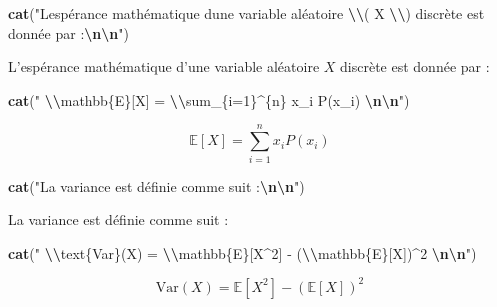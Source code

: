\documentclass[
]{article}
\newenvironment{Shaded}{\begin{snugshade}}{\end{snugshade}}
\newcommand{\FunctionTok}[1]{\textcolor[rgb]{0.13,0.29,0.53}{\textbf{#1}}}
\newcommand{\NormalTok}[1]{#1}
\newcommand{\SpecialCharTok}[1]{\textcolor[rgb]{0.81,0.36,0.00}{\textbf{#1}}}
\newcommand{\StringTok}[1]{\textcolor[rgb]{0.31,0.60,0.02}{#1}}
\begin{document}
\begin{Shaded}
\begin{Highlighting}[]
\FunctionTok{cat}\NormalTok{(}\StringTok{"L\textquotesingle{}espérance mathématique d\textquotesingle{}une variable aléatoire }\SpecialCharTok{\textbackslash{}\textbackslash{}}\StringTok{( X }\SpecialCharTok{\textbackslash{}\textbackslash{}}\StringTok{) discrète est donnée par :}\SpecialCharTok{\textbackslash{}n\textbackslash{}n}\StringTok{"}\NormalTok{)}
\end{Highlighting}
\end{Shaded}

L'espérance mathématique d'une variable aléatoire \(X\) discrète est
donnée par :

\begin{Shaded}
\begin{Highlighting}[]
\FunctionTok{cat}\NormalTok{(}\StringTok{"$$ }\SpecialCharTok{\textbackslash{}\textbackslash{}}\StringTok{mathbb\{E\}[X] = }\SpecialCharTok{\textbackslash{}\textbackslash{}}\StringTok{sum\_\{i=1\}\^{}\{n\} x\_i P(x\_i) $$}\SpecialCharTok{\textbackslash{}n\textbackslash{}n}\StringTok{"}\NormalTok{)}
\end{Highlighting}
\end{Shaded}

\[ \mathbb{E}[X] = \sum_{i=1}^{n} x_i P(x_i) \]

\begin{Shaded}
\begin{Highlighting}[]
\FunctionTok{cat}\NormalTok{(}\StringTok{"La variance est définie comme suit :}\SpecialCharTok{\textbackslash{}n\textbackslash{}n}\StringTok{"}\NormalTok{)}
\end{Highlighting}
\end{Shaded}

La variance est définie comme suit :

\begin{Shaded}
\begin{Highlighting}[]
\FunctionTok{cat}\NormalTok{(}\StringTok{"$$ }\SpecialCharTok{\textbackslash{}\textbackslash{}}\StringTok{text\{Var\}(X) = }\SpecialCharTok{\textbackslash{}\textbackslash{}}\StringTok{mathbb\{E\}[X\^{}2] {-} (}\SpecialCharTok{\textbackslash{}\textbackslash{}}\StringTok{mathbb\{E\}[X])\^{}2 $$}\SpecialCharTok{\textbackslash{}n\textbackslash{}n}\StringTok{"}\NormalTok{)}
\end{Highlighting}
\end{Shaded}

\[ \text{Var}(X) = \mathbb{E}[X^2] - (\mathbb{E}[X])^2 \]
\end{document}
